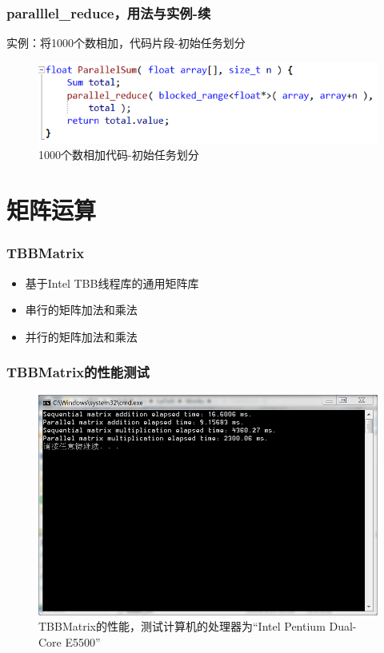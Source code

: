 \documentclass[hyperref={unicode},13pt,a4paper]{beamer}
\begin{document}
\begin{CJK*}{UTF8}{song}
\begin{frame}
	\frametitle{paralllel\_reduce，用法与实例-续}
    实例：将1000个数相加，代码片段-初始任务划分
	\begin{figure}
	\centering
	\includegraphics[width=0.87\linewidth]{parallel_reduce_2}
	\caption[1000个数相加代码-初始任务划分]{1000个数相加代码-初始任务划分} 
	\end{figure}
\end{frame}

\section{矩阵运算}
\begin{frame}
	\frametitle{TBBMatrix}
	\begin{itemize}
    \item 基于Intel TBB线程库的通用矩阵库
    \item 串行的矩阵加法和乘法
    \item 并行的矩阵加法和乘法
    \end{itemize}
\end{frame}

\begin{frame}
	\frametitle{TBBMatrix的性能测试}
    \begin{figure}
    \centering
    \includegraphics[width=0.9\linewidth]{tbbmatrix_performance}
    \caption[TBBMatrix的性能]{TBBMatrix的性能，测试计算机的处理器为“Intel Pentium Dual-Core E5500”} 
    \label{fig:tbbmatrix_performance}
    \end{figure}
\end{frame}


\end{CJK*}
\end{document}
